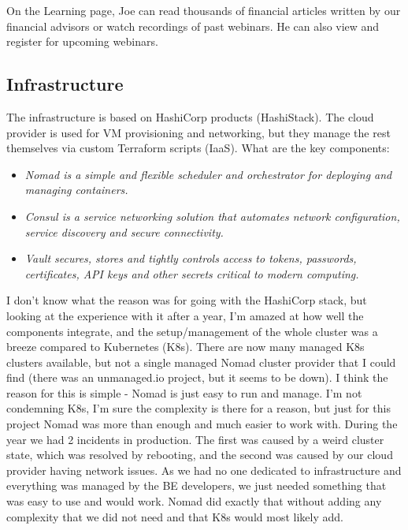 \begin{example}[Education]
    On the Learning page, Joe can read thousands of financial articles written by our financial advisors or watch recordings of past webinars. He can also view and register for upcoming webinars.
\end{example}



\subsection{Infrastructure}
The infrastructure is based on HashiCorp products (HashiStack). The cloud provider is used for VM provisioning and networking, but they manage the rest themselves via custom Terraform scripts (IaaS). What are the key components:
\begin{itemize}
    \item \it{Nomad} is a simple and flexible scheduler and orchestrator for deploying and managing containers. \cite{NOMAD}
    \item \it{Consul} is a service networking solution that automates network configuration, service discovery and secure connectivity. \cite{CONSUL}
    \item \it{Vault} secures, stores and tightly controls access to tokens, passwords, certificates, API keys and other secrets critical to modern computing. \cite{VAULT}
\end{itemize}

I don't know what the reason was for going with the HashiCorp stack, but looking at the experience with it after a year, I'm amazed at how well the components integrate, and the setup/management of the whole cluster was a breeze compared to Kubernetes (K8s). There are now many managed K8s clusters available, but not a single managed Nomad cluster provider that I could find (there was an unmanaged.io project, but it seems to be down). I think the reason for this is simple - Nomad is just easy to run and manage. I'm not condemning K8s, I'm sure the complexity is there for a reason, but just for this project Nomad was more than enough and much easier to work with. During the year we had 2 incidents in production. The first was caused by a weird cluster state, which was resolved by rebooting, and the second was caused by our cloud provider having network issues. As we had no one dedicated to infrastructure and everything was managed by the BE developers, we just needed something that was easy to use and would work. Nomad did exactly that without adding any complexity that we did not need and that K8s would most likely add.

